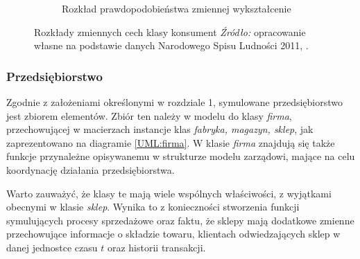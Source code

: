 \documentclass[polish, twoside, 12pt, a4paper]{article}
\theoremstyle{definition}
\theoremstyle{plain}
\theoremstyle{remark}
\begin{document}
\begin{figure}[hbt]
\begin{subfigure}[t]{0.45\textwidth}
    \caption{Rozkład prawdopodobieństwa zmiennej wykształcenie}
    \label{fig:wyksztalcenie}
  \end{subfigure}
  \captionsetup{margin=10pt,font=small,labelfont=bf,width=.8\textwidth}
  \caption[Rozkłady zmiennych cech klasy konsument]{Rozkłady zmiennych cech klasy konsument \textit{Źródło:} opracowanie własne na podstawie danych Narodowego Spisu Ludności 2011, \cite{GUS2011}.}\label{fig:cechykonsumenta}
\end{figure}


\subsubsection{Przedsiębiorstwo}

Zgodnie z założeniami określonymi w rozdziale 1, symulowane przedsiębiorstwo jest zbiorem elementów. Zbiór ten należy w modelu do klasy \textit{firma}, przechowującej w macierzach instancje klas \textit{fabryka, magazyn, sklep}, jak zaprezentowano na diagramie \ref{UML:firma}. W klasie \textit{firma} znajdują się także funkcje przynależne opisywanemu w strukturze modelu zarządowi, mające na celu koordynację działania przedsiębiorstwa. 

Warto zauważyć, że klasy te mają wiele wspólnych właściwości, z wyjątkami obecnymi w klasie \textit{sklep}. Wynika to z konieczności stworzenia funkcji symulujących procesy sprzedażowe oraz faktu, że sklepy mają dodatkowe zmienne przechowujące informacje o składzie towaru, klientach odwiedzających sklep w danej jednostce czasu $t$ oraz historii transakcji.  
\end{document}
